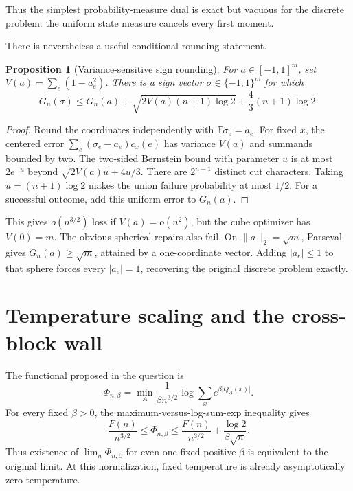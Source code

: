 \documentclass[11pt]{article}
\newtheorem{proposition}[theorem]{Proposition}
\newcommand{\eps}{\{-1,1\}}
\newcommand{\E}{\mathbb E}
\begin{document}
Thus the simplest probability-measure dual is exact but vacuous for the
discrete problem: the uniform state measure cancels every first moment.

There is nevertheless a useful conditional rounding statement.

\begin{proposition}[Variance-sensitive sign rounding]
\label{prop:rounding}
For \(a\in[-1,1]^m\), set \(V(a)=\sum_e(1-a_e^2)\).  There is a sign vector
\(\sigma\in\eps^m\) for which
\[
 G_n(\sigma)\le G_n(a)
 +\sqrt{2V(a)(n+1)\log2}
 +\frac43(n+1)\log2.
\]
\end{proposition}

\begin{proof}
Round the coordinates independently with \(\E\sigma_e=a_e\).  For fixed
\(x\), the centered error
\(\sum_e(\sigma_e-a_e)c_x(e)\) has variance \(V(a)\) and summands bounded by
two.  The two-sided Bernstein bound with parameter \(u\) is at most
\(2e^{-u}\) beyond
\(\sqrt{2V(a)u}+4u/3\).  There are \(2^{n-1}\) distinct cut characters.
Taking \(u=(n+1)\log2\) makes the union failure probability at most \(1/2\).
For a successful outcome, add this uniform error to \(G_n(a)\).
\end{proof}

This gives \(o(n^{3/2})\) loss if \(V(a)=o(n^2)\), but the cube optimizer has
\(V(0)=m\).  The obvious spherical repairs also fail.  On
\(\|a\|_2=\sqrt m\), Parseval gives \(G_n(a)\ge\sqrt m\), attained by a
one-coordinate vector.  Adding \(|a_e|\le1\) to that sphere forces every
\(|a_e|=1\), recovering the original discrete problem exactly.

\section{Temperature scaling and the cross-block wall}

The functional proposed in the question is
\[
 \Phi_{n,\beta}=\min_A\frac1{\beta n^{3/2}}
 \log\sum_x e^{\beta|Q_A(x)|}.
\]
For every fixed \(\beta>0\), the maximum-versus-log-sum-exp inequality gives
\begin{equation}
 \frac{F(n)}{n^{3/2}}
 \le\Phi_{n,\beta}
 \le\frac{F(n)}{n^{3/2}}+\frac{\log2}{\beta\sqrt n}.
 \label{eq:proposedtemp}
\end{equation}
Thus existence of \(\lim_n\Phi_{n,\beta}\) for even one fixed positive
\(\beta\) is equivalent to the original limit.  At this normalization,
fixed temperature is already asymptotically zero temperature.
\end{document}

